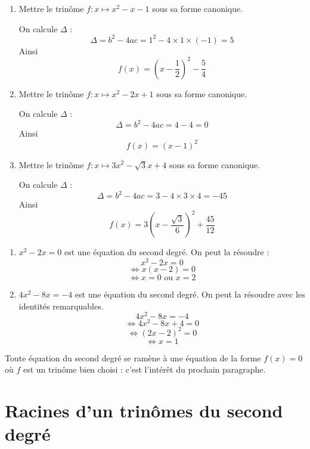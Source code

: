 \begin{exemples}
\begin{enumerate}
\item Mettre le trinôme $f:x\mapsto x^2-x-1$ sous sa forme canonique.\newline \newline

On calcule $\Delta$ : 
$$\Delta = b^2-4ac = 1^2 - 4\times 1\times(-1) = 5$$
Ainsi 
$$f(x) = \left(x-\dfrac{1}{2}\right)^2 - \dfrac{5}{4}$$
\item Mettre le trinôme $f:x\mapsto x^2-2x+1$ sous sa forme canonique.\newline \newline

On calcule $\Delta$ : 
$$\Delta = b^2-4ac = 4-4 = 0$$
Ainsi 
$$f(x) = \left(x-1\right)^2$$
\item Mettre le trinôme $f:x\mapsto 3x^2-\sqrt{3}x+4$ sous sa forme canonique.\newline \newline

On calcule $\Delta$ : 
$$\Delta = b^2-4ac = 3 - 4\times3\times4 = -45$$
Ainsi 
$$f(x) = 3\left(x-\dfrac{\sqrt{3}}{6}\right)^2 + \dfrac{45}{12}$$
\end{enumerate}
\end{exemples}
\newline
\begin{exemples}
\begin{enumerate}
\item $x^2-2x = 0$ est une équation du second degré. On peut la résoudre :
$$x^2 -2 x = 0$$
$$\Leftrightarrow x(x-2) = 0$$
$$\Leftrightarrow x = 0 \text{ ou } x =2 $$
\item $4x^2 - 8x = -4$ est une équation du second degré. On peut la résoudre avec les identités remarquables.
$$4x^2-8x = -4$$
$$\Leftrightarrow 4x^2 - 8x + 4 = 0$$
$$\Leftrightarrow (2x-2)^2 = 0$$
$$\Leftrightarrow x = 1$$
\end{enumerate}
\end{exemples}
\begin{remarque}
Toute équation du second degré se ramène à une équation de la forme $f(x) = 0$ où $f$ est un trinôme bien choisi : c'est l'intérêt du prochain paragraphe.
\end{remarque}
\section{Racines d'un trinômes du second degré}
\newline


